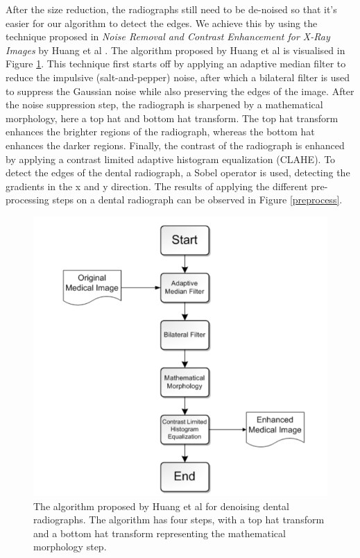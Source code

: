 \documentclass[a4paper,titlepage,12pt]{article}
\begin{document}
After the size reduction, the radiographs still need to be de-noised so that it's easier for our algorithm to detect the edges.
We achieve this by using the technique proposed in \textit{Noise Removal and Contrast Enhancement for X-Ray Images} by Huang et al \cite{JBEMI1893}.
The algorithm proposed by Huang et al is visualised in Figure \ref{preprocessalgo}. This technique first starts off by applying an adaptive median filter to reduce the impulsive (salt-and-pepper) noise, after which a bilateral filter is used to suppress the Gaussian noise while also preserving the edges of the image.
After the noise suppression step, the radiograph is sharpened by a mathematical morphology, here a top hat and bottom hat transform.
The top hat transform enhances the brighter regions of the radiograph, whereas the bottom hat enhances the darker regions.
Finally, the contrast of the radiograph is enhanced by applying a contrast limited adaptive histogram equalization (CLAHE).
To detect the edges of the dental radiograph, a Sobel operator is used, detecting the gradients in the x and y direction.
The results of applying the different pre-processing steps on a dental radiograph can be observed in Figure \ref{preprocess}. 


\begin{figure}
\centering
\includegraphics[width=0.7\linewidth]{preprocess/algorithm.png}
  \caption{
		The algorithm proposed by Huang et al \cite{JBEMI1893} for denoising dental radiographs. The algorithm has four steps, with a top hat transform and a bottom hat transform representing the mathematical morphology step. } \label{preprocessalgo}
\end{figure}
\end{document}
